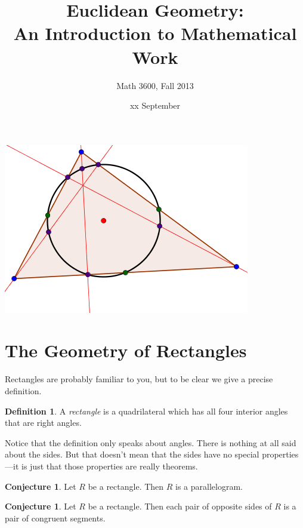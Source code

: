 \documentclass{tufte-handout}
\title{Euclidean Geometry:\\An Introduction to Mathematical Work}
\author[]{Math 3600, Fall 2013}
\date{xx September}
\theoremstyle{definition}
\newtheorem{conjecture}[problem]{Conjecture}
\newtheorem*{definition}{Definition}
\begin{document}
\maketitle
\begin{marginfigure}
    \includegraphics{NPC}
\end{marginfigure}

\setcounter{section}{3}
\section{The Geometry of Rectangles}\label{section:rectangles}

Rectangles are probably familiar to you, but to be clear we give a precise definition.
\begin{definition}\label{defn:rectangle}
A \emph{rectangle} is a quadrilateral which has all four interior angles that are right angles.
\end{definition}

Notice that the definition only speaks about angles. There is nothing at all said about the sides.
But that doesn't mean that the sides have no special properties---it is just that those properties are really theorems.

\begin{conjecture}\label{conj:rectangle-parallelogram}
Let $R$ be a rectangle. Then $R$ is a parallelogram.
\end{conjecture}

\begin{conjecture}\label{conj:rectangle-opp-sides}
Let $R$ be a rectangle. Then each pair of opposite sides of $R$ is a pair of congruent segments.
\end{conjecture}
\end{document}
